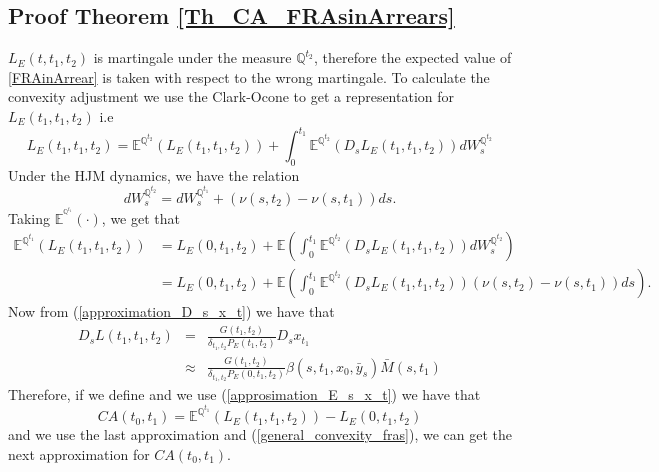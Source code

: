 \documentclass[a4paper,10pt]{article}
\newcommand{\1}{\mathbf{1}}
\begin{document}
\subsection{Proof Theorem \ref{Th_CA_FRAsinArrears}}\label{Proof_CA_FRAsinArrears}
$L_{E}(t,t_1,t_2)$ is martingale under the measure $\mathbb{Q}^{t_2}$, therefore the expected value of \eqref{FRAinArrear} is taken with respect to the wrong martingale. To calculate the convexity adjustment we use the Clark-Ocone to get a representation for $L_{E}(t_1,t_1,t_2)$ i.e
\begin{equation}\label{general_convexity_fras}
L_{E}(t_1,t_1,t_2) = \mathbb{E}^{\mathbb{Q}^{t_2}}\left(L_{E}(t_1,t_1,t_2) \right) + \int_{0}^{t_1} \mathbb{E}^{\mathbb{Q}^{t_2}}\left(D_s L_{E}(t_1,t_1,t_2) \right) dW^{\mathbb{Q}^{t_2}}_{s}
\end{equation}
Under the HJM dynamics, we have the relation
\begin{equation*}
dW^{\mathbb{Q}^{t_2}}_s = dW^{\mathbb{Q}^{t_1}}_s + (\nu(s,t_2) - \nu(s,t_1)) ds. 
\end{equation*}
Taking $\mathbb{E}^{^{\mathbb{Q}^{t_1}}}(\cdot)$, we get that
\begin{align*}
\mathbb{E}^{\mathbb{Q}^{t_1}}\left(L_{E}(t_1,t_1,t_2) \right) &= L_{E}(0,t_1,t_2) + \mathbb{E}\left( \int_{0}^{t_1} \mathbb{E}^{\mathbb{Q}^{t_2}}\left(D_s L_{E}(t_1,t_1,t_2) \right) dW^{\mathbb{Q}^{t_2}}_{s}\right)\\
&= L_{E}(0,t_1,t_2) + \mathbb{E}\left( \int_{0}^{t_1} \mathbb{E}^{\mathbb{Q}^{t_2}}\left(D_s L_{E}(t_1,t_1,t_2) \right) (\nu(s,t_2)-\nu(s,t_1)) ds \right).
\end{align*}
Now from (\ref{approximation_D_s_x_t}) we have that 
\begin{eqnarray*}
D_s L(t_1,t_1,t_2) &=& \frac{G(t_1,t_2)}{\delta_{t_1,t_2}P_{E}(t_1,t_2)} D_s x_{t_1}\\
&\approx& \frac{G(t_1,t_2)}{\delta_{t_1,t_2}P_{E}(0,t_1,t_2)} \beta(s,t_1, x_0, \bar{y}_s)\bar{M}(s,t_1)
\end{eqnarray*}
Therefore, if we define and we use (\ref{approsimation_E_s_x_t}) we have that
\begin{equation*}
CA(t_0,t_1) = \mathbb{E}^{\mathbb{Q}^{t_1}}\left( L_{E}\left(t_1,t_1,t_2\right)\right) - L_{E}\left(0,t_1,t_2\right)
\end{equation*}
and we use the last approximation and (\ref{general_convexity_fras}), we can get the next approximation for $CA(t_0,t_1)$.
\end{document}
